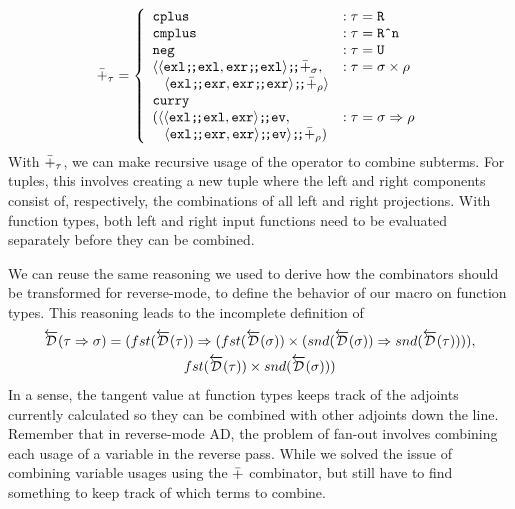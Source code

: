   \begin{align*}
    \synP_\tau =
      \left\{
        \begin{array}{ll}
          \synCplus & : \tau = \synR \\
          \synCmplus & : \tau = \synRn \\
          \synNeg & : \tau = \synUnit \\
          \langle
            \synSeq{\langle \synSeq{\synExl}{\synExl}, \synSeq{\synExr}{\synExl} \rangle}{\synP_\sigma}, & : \tau = \sigma \synStar \rho \\
            \;\;\;\synSeq{\langle \synSeq{\synExl}{\synExr}, \synSeq{\synExr}{\synExr} \rangle}{\synP_\rho} \rangle \\
          \synCurry{ \\
            (\synSeq{\langle
              \synSeq{\langle \synSeq{\synExl}{\synExl}, \synExr \rangle}{\synEv}, & : \tau = \sigma \synFunc \rho \\
              \;\;\;\synSeq{\langle \synSeq{\synExl}{\synExr}, \synExr \rangle}{\synEv} \rangle}{\synP_\rho})} \\
        \end{array}
      \right.
  \end{align*}
  With $\bar{+}_\tau$, we can make recursive usage of the operator to combine subterms.
  For tuples, this involves creating a new tuple where the left and right components consist of, respectively, the combinations of all left and right projections.
  With function types, both left and right input functions need to be evaluated separately before they can be combined.

  We can reuse the same reasoning we used to derive how the combinators should be transformed for reverse-mode, to define the behavior of our macro on function types.
  This reasoning leads to the incomplete definition of
  \begin{multline}
    \overleftarrow{\mathcal{D}}(\tau \Rightarrow \sigma) = (fst(\overleftarrow{\mathcal{D}}(\tau)) \Rightarrow (fst(\overleftarrow{\mathcal{D}}(\sigma)) \times (snd(\overleftarrow{\mathcal{D}}(\sigma)) \Rightarrow snd(\overleftarrow{\mathcal{D}}(\tau)))),
      \\ fst(\overleftarrow{\mathcal{D}}(\tau)) \times snd (\overleftarrow{\mathcal{D}}(\sigma)))
    \label{eqn:combinator_d_incorrect}
  \end{multline}
  In a sense, the tangent value at function types keeps track of the adjoints currently calculated so they can be combined with other adjoints down the line.
  Remember that in reverse-mode AD, the problem of fan-out involves combining each usage of a variable in the reverse pass.
  While we solved the issue of combining variable usages using the $\bar{+}$ combinator, but still have to find something to keep track of which terms to combine.

